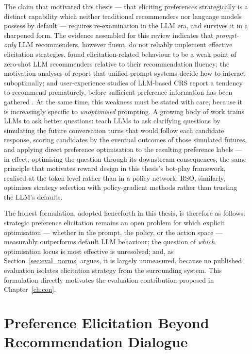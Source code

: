 The claim that motivated this thesis — that eliciting preferences strategically is a distinct capability which neither traditional recommenders nor language models possess by default — requires re-examination in the LLM era, and survives it in a sharpened form. The evidence assembled for this review indicates that \textit{prompt-only} LLM recommenders, however fluent, do not reliably implement effective elicitation strategies. \citet{he2023large} found elicitation-related behaviour to be a weak point of zero-shot LLM recommenders relative to their recommendation fluency; the motivation analyses of \citet{zhao2025reinforced} report that unified-prompt systems decide how to interact suboptimally; and user-experience studies of LLM-based CRS report a tendency to recommend prematurely, before sufficient preference information has been gathered \citep{kostric2025should, zhao2025reinforced}. At the same time, this weakness must be stated with care, because it is increasingly specific to \textit{unoptimised} prompting. A growing body of work trains LLMs to ask better questions: \citet{zhang2025modeling} teach LLMs to ask clarifying questions by simulating the future conversation turns that would follow each candidate response, scoring candidates by the eventual outcomes of those simulated futures, and applying direct preference optimisation to the resulting preference labels — in effect, optimising the question through its downstream consequences, the same principle that motivates reward design in this thesis's bot-play framework, realised at the token level rather than in a policy network. RSO, similarly, optimises strategy selection with policy-gradient methods rather than trusting the LLM's defaults.

The honest formulation, adopted henceforth in this thesis, is therefore as follows: strategic preference elicitation remains an open problem for which explicit optimisation — whether in the prompt, the policy, or the action space — measurably outperforms default LLM behaviour; the question of \textit{which} optimisation locus is most effective is unresolved; and, as Section~\ref{sec:eval_norms} argues, it is largely unmeasured, because no published evaluation isolates elicitation strategy from the surrounding system. This formulation directly motivates the evaluation contribution proposed in Chapter~\ref{ch:con}.

\section{Preference Elicitation Beyond Recommendation Dialogue}
\label{sec:elicitation_llm}

